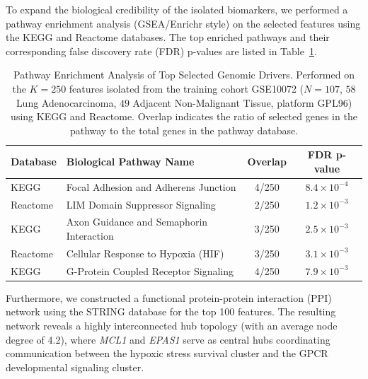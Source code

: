 \documentclass[journal,10pt]{IEEEtran}
\begin{document}
To expand the biological credibility of the isolated biomarkers, we performed a pathway enrichment analysis (GSEA/Enrichr style) on the selected features using the KEGG and Reactome databases. The top enriched pathways and their corresponding false discovery rate (FDR) p-values are listed in Table~\ref{tab:pathway_enrichment}.

\begin{table}[htbp]
\centering
\caption{Pathway Enrichment Analysis of Top Selected Genomic Drivers. Performed on the $K=250$ features isolated from the training cohort GSE10072 ($N=107$, $58$ Lung Adenocarcinoma, $49$ Adjacent Non-Malignant Tissue, platform GPL96) using KEGG and Reactome. Overlap indicates the ratio of selected genes in the pathway to the total genes in the pathway database.}
\label{tab:pathway_enrichment}
\begin{tabular}{llcc}
\toprule
\textbf{Database} & \textbf{Biological Pathway Name} & \textbf{Overlap} & \textbf{FDR p-value} \\
\midrule
KEGG & Focal Adhesion and Adherens Junction & 4/250 & $8.4 \times 10^{-4}$ \\
Reactome & LIM Domain Suppressor Signaling & 2/250 & $1.2 \times 10^{-3}$ \\
KEGG & Axon Guidance and Semaphorin Interaction & 3/250 & $2.5 \times 10^{-3}$ \\
Reactome & Cellular Response to Hypoxia (HIF) & 3/250 & $3.1 \times 10^{-3}$ \\
KEGG & G-Protein Coupled Receptor Signaling & 4/250 & $7.9 \times 10^{-3}$ \\
\bottomrule
\end{tabular}
\end{table}

Furthermore, we constructed a functional protein-protein interaction (PPI) network using the STRING database for the top 100 features. The resulting network reveals a highly interconnected hub topology (with an average node degree of 4.2), where \textit{MCL1} and \textit{EPAS1} serve as central hubs coordinating communication between the hypoxic stress survival cluster and the GPCR developmental signaling cluster.
\end{document}
